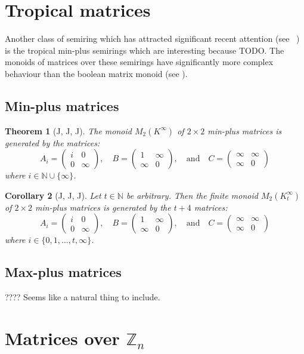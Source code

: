 \documentclass[11pt]{article}
\newtheorem{thm}{Theorem}[section]
\newtheorem{cor}[thm]{Corollary}
\numberwithin{equation}{section}
\newcommand{\N}{\mathbb{N}}
\newcommand{\mat}[4]{\begin{pmatrix}#1&#2\\#3&#4\end{pmatrix}}
\begin{document}
\section{Tropical matrices}

Another class of semiring which has attracted significant recent attention (see
~\cite{TODO}) is the tropical min-plus semirings which are interesting because
TODO. The monoids of matrices over these semirings have significantly more
complex behaviour than the boolean matrix monoid (see \cite{TODO}).

\subsection{Min-plus matrices}

\begin{thm}[J, J, J]\label{thm-min-plus}
  The monoid $M_{2}(K^{\infty})$ of $2 \times 2$ min-plus matrices is
  generated by the matrices:
  \begin{equation*}
          A_{i} = \mat{i}{0}{0}{\infty},
    \quad B     = \mat{1}{\infty}{\infty}{0},
    \quad \text{and}
    \quad C     =  \mat{\infty}{\infty}{\infty}{0}
  \end{equation*}
  where $i \in \N \cup \{\infty\}$.
\end{thm}

\begin{cor}[J, J, J]\label{cor-finite-min-plus}
  Let $t \in \N$ be arbitrary. Then the finite monoid $M_{2}(K^{\infty}_t)$ of
  $2 \times 2$ min-plus matrices is generated by the $t + 4$ matrices:
  \begin{equation*}
          A_{i} = \mat{i}{0}{0}{\infty},
    \quad B     = \mat{1}{\infty}{\infty}{0},
    \quad \text{and}
    \quad C     =  \mat{\infty}{\infty}{\infty}{0}
  \end{equation*}
  where $i \in \{0, 1, \ldots, t, \infty\}$.
\end{cor}

\subsection{Max-plus matrices}
???? Seems like a natural thing to include.

\section{Matrices over $\mathbb{Z}_n$}
\end{document}
